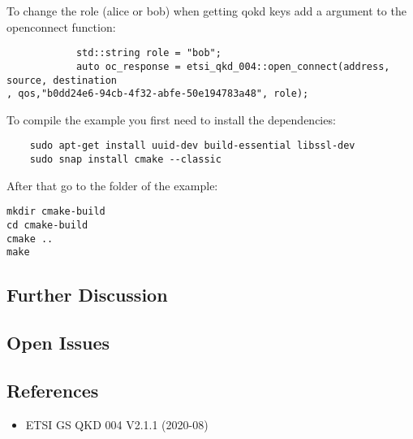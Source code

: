 \begin{refsection}
\begin{itemize}
		To change the role (alice or bob) when getting qokd keys add a argument to the open\textunderscore connect function:

		\begin{verbatim}
			std::string role = "bob";
			auto oc_response = etsi_qkd_004::open_connect(address, source, destination
, qos,"b0dd24e6-94cb-4f32-abfe-50e194783a48", role);
		\end{verbatim}


\end{itemize}

To compile the example you first need to install the dependencies:
\begin{verbatim}
	sudo apt-get install uuid-dev build-essential libssl-dev
	sudo snap install cmake --classic
\end{verbatim}

After that go to the folder of the example:
\begin{verbatim}
mkdir cmake-build
cd cmake-build
cmake ..
make
\end{verbatim}
\subsection{Further Discussion}

\subsection{Open Issues}

\subsection{References}

\begin{itemize}
	\item
		ETSI GS QKD 004 V2.1.1 (2020-08)
\end{itemize}




\pagebreak





\clearpage
\printbibliography[heading=subbibliography]
\end{refsection}
\cleardoublepage

